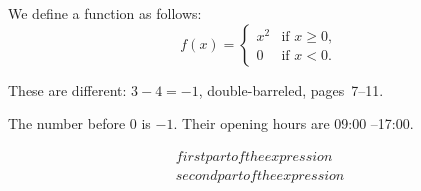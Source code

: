 \documentclass[11pt, a4paper]{amsart}
\begin{document}
We define a function as follows:
\[
f(x) =
\begin{cases}
x^2 & \text{if } x \ge 0,\\
0 & \text{if } x < 0.
\end{cases}
\]

These are different: $3 - 4 = -1$,
double-barreled, pages~7--11.

The number before 0 is $-1$.
Their opening hours are 09:00 --17:00.

\begin{multline*}
first part of the expression \\
second part of the expression
\end{multline*}
\end{document}
